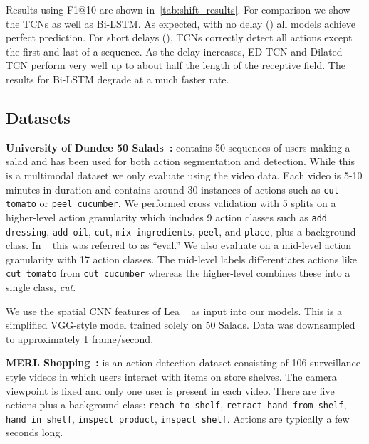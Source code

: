 \documentclass[10pt,twocolumn,letterpaper]{article}
\newcommand{\fakesubsection}[1]{\smallskip\noindent\textbf{#1:}}
\begin{document}
Results using F1@10 are shown in~\ref{tab:shift_results}. For comparison we show the TCNs as well as Bi-LSTM.
As expected, with no delay () all models achieve perfect prediction. For short delays (), TCNs correctly detect all actions except the first and last of a sequence. 
As the delay increases, ED-TCN and Dilated TCN perform very well up to about half the length of the receptive field. 
The results for Bi-LSTM degrade at a much faster rate.









\subsection{Datasets}














\fakesubsection{University of Dundee 50 Salads~\cite{stein_ubicomp_2013}}
contains 50 sequences of users making a salad and has been used for both action segmentation and detection. 
While this is a multimodal dataset we only evaluate using the video data. 
Each video is 5-10 minutes in duration and contains around 30 instances of actions such as \texttt{cut tomato} or \texttt{peel cucumber}. 
We performed cross validation with 5 splits on a higher-level action granularity which includes 9 action classes such as \texttt{add dressing}, \texttt{add oil}, \texttt{cut}, \texttt{mix ingredients}, \texttt{peel}, and \texttt{place}, plus a background class. In ~\cite{stein_ubicomp_2013} this was referred to as ``eval.''
We also evaluate on a mid-level action granularity with 17 action classes. 
The mid-level labels differentiates actions like \texttt{cut tomato} from \texttt{cut cucumber} whereas the higher-level combines these into a single class, \textit{cut}. 



We use the spatial CNN features of Lea \etal~\cite{lea_eccv_2016} as input into our models. This is a simplified VGG-style model trained solely on 50 Salads. 
Data was downsampled to approximately 1 frame/second. 


\fakesubsection{MERL Shopping~\cite{singh_cvpr_2016_merl}} is an action detection dataset
consisting of 106 surveillance-style videos in which users interact with items on store shelves. The camera viewpoint is fixed and only one user is present in each video. There are five actions plus a background class: \texttt{reach to shelf},  \texttt{retract hand from shelf}, \texttt{hand in shelf}, \texttt{inspect product}, \texttt{inspect shelf}. Actions are typically a few seconds long. 
\end{document}
